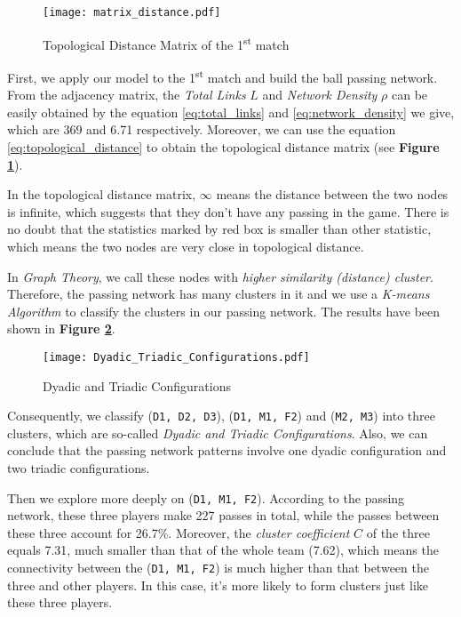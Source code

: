 \documentclass[12pt]{article}  %
\newcommand{\upcite}[1]{\textsuperscript{\textsuperscript{\cite{#1}}}}
\begin{document}
\begin{figure}[htbp]
    \centering
    \texttt{[image: matrix\_distance.pdf]} 	%
    \caption{Topological Distance Matrix of the 1\textsuperscript{st} match}		%
    \label{fig:matrix_distance}							%
\end{figure}

First, we apply our model to the 1\textsuperscript{st} match and build the ball passing network. From the adjacency matrix, the \textit{Total Links} $L$ and \textit{Network Density} $\rho$ can be easily obtained by the equation \eqref{eq:total_links} and \eqref{eq:network_density} we give, which are 369 and 6.71 respectively. Moreover, we can use the equation \eqref{eq:topological_distance} to obtain the topological distance matrix (see \textbf{Figure \ref{fig:matrix_distance}}).


In the topological distance matrix, $\infty$ means the distance between the two nodes is infinite, which suggests that they don't have any passing in the game. There is no doubt that the statistics marked by red box is smaller than other statistic, which means the two nodes are very close in topological distance. 

In \textit{Graph Theory}, we call these nodes with \textit{higher similarity (distance) cluster}. Therefore, the passing network has many clusters in it and we use a \textit{K-means Algorithm}\upcite{5}  to classify the clusters in our passing network. The results have been shown in \textbf{Figure \ref{fig:K-means}}.

\begin{figure}[htbp]
    \centering
    \texttt{[image: Dyadic\_Triadic\_Configurations.pdf]} 	%
    \caption{Dyadic and Triadic Configurations}		%
    \label{fig:K-means}							%
\end{figure}

Consequently, we classify (\texttt{D1, D2, D3}), (\texttt{D1, M1, F2}) and (\texttt{M2, M3}) into three clusters, which are so-called \textit{Dyadic and Triadic Configurations}. Also, we can conclude that the passing network patterns involve one dyadic configuration and two triadic configurations. 

Then we explore more deeply on (\texttt{D1, M1, F2}). According to the passing network, these three players make 227 passes in total, while the passes between these three account for 26.7\%. Moreover, the \textit{cluster coefficient} $C$ of the three equals 7.31, much smaller than that of the whole team (7.62), which means the connectivity between the (\texttt{D1, M1, F2}) is much higher than that between the three and other players. In this case, it's more likely to form clusters just like these three players. 
\end{document}
